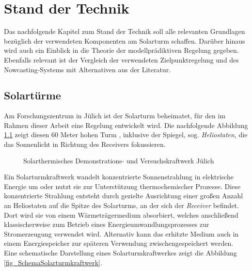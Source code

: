 \chapter{Stand der Technik} \label{ch_StandTechnik}
Das nachfolgende Kapitel zum Stand der Technik soll alle relevanten Grundlagen bezüglich der verwendeten Komponenten am Solarturm schaffen.
Darüber hinaus wird auch ein Einblick in die Theorie der modellprädiktiven Regelung gegeben.
Ebenfalls relevant ist der Vergleich der verwendeten Zielpunktregelung und des Nowcasting-Systems mit Alternativen aus der Literatur.

\section{Solartürme} \label{sec_Solartürme}
Am Forschungszentrum in Jülich ist der Solarturm beheimatet, für den im Rahmen dieser Arbeit eine Regelung entwickelt wird.
Die nachfolgende Abbildung \ref{fig_Solarturm} zeigt diesen 60 Meter hohen Turm \cite{DLRSolartürmeBild}, inklusive der Spiegel, sog. \textit{Heliostaten}, die das Sonnenlicht in Richtung des Receivers fokussieren.

\begin{figure}[h!]
    \centering
    \setlength{\fboxsep}{1pt}
    \setlength{\fboxrule}{1pt}
\caption[Solarthermisches Demonstrations- und Versuchskraftwerk Jülich]{Solarthermisches Demonstrations- und Versuchskraftwerk Jülich \cite{DLRSolartürmeBild}}
    \label{fig_Solarturm}
\end{figure}

Ein Solarturmkraftwerk wandelt konzentrierte Sonnenstrahlung in elektrische Energie um oder nutzt sie zur Unterstützung thermochemischer Prozesse.
Diese konzentrierte Strahlung entsteht durch gezielte Ausrichtung einer großen Anzahl an Heliostaten auf die Spitze des Solarturms, an der sich der \textit{Receiver} befindet.
Dort wird sie von einem Wärmeträgermedium absorbiert, welches anschließend klassischerweise zum Betrieb eines Energieumwandlungsprozesses zur Stromerzeugung verwendet wird.
Alternativ kann das erhitzte Medium auch in einem Energiespeicher zur späteren Verwendung zwischengespeichert werden. \cite[S. 11]{DissBelhomme}
Eine schematische Darstellung eines Solarturmkraftwerkes zeigt die Abbildung \ref{fig_SchemaSolarturmkraftwerk}.

